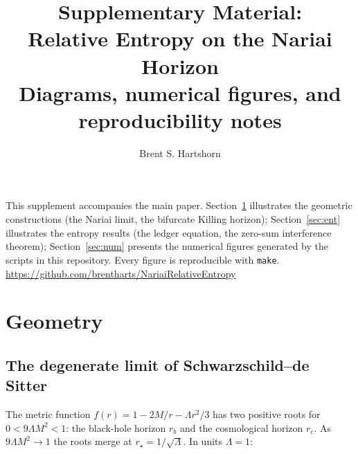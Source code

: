 \documentclass[11pt]{article}
\title{\textbf{Supplementary Material:\\ Relative Entropy on the \mbox{Nariai} Horizon}\\[4pt]
\large Diagrams, numerical figures, and reproducibility notes}
\author{Brent S. Hartshorn}
\begin{document}
\maketitle

\noindent
This supplement accompanies the main paper. Section~\ref{sec:geo} illustrates the geometric constructions (the \mbox{Nariai} limit, the bifurcate Killing horizon); Section~\ref{sec:ent} illustrates the entropy results (the ledger equation, the zero-sum interference theorem); Section~\ref{sec:num} presents the numerical figures generated by the scripts in this repository. Every figure is reproducible with \texttt{make}.
\newline
\url{https://github.com/brentharts/NariaiRelativeEntropy}

\section{Geometry}
\label{sec:geo}

\subsection{The degenerate limit of Schwarzschild--de Sitter}

The metric function $f(r) = 1 - 2M/r - \Lambda r^2/3$ has two positive roots for $0 < 9\Lambda M^2 < 1$: the black-hole horizon $r_b$ and the cosmological horizon $r_c$. As $9\Lambda M^2 \to 1$ the roots merge at $r_\star = 1/\sqrt{\Lambda}$. In units $\Lambda = 1$:

\begin{center}
\end{center}
\end{document}
